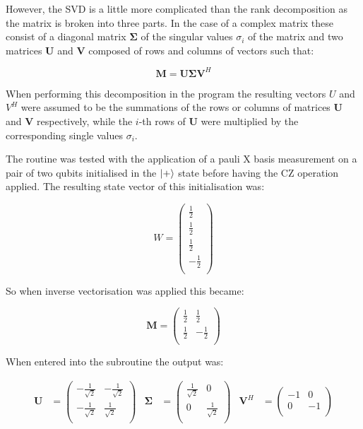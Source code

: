 However, the SVD is a little more complicated than the rank decomposition as the matrix is broken into three parts. In the case of a complex matrix these consist of a diagonal matrix $\boldsymbol{\Sigma}$ of the singular values $\sigma_{i}$ of the matrix and two matrices $\mathbf{U}$ and $\mathbf{V}$ composed of rows and columns of vectors such that:

\begin{equation}
\mathbf{M} = \mathbf{U} \boldsymbol{\Sigma} \mathbf{V}^{H}
\end{equation}

When performing this decomposition in the program the resulting vectors $U$ and $V^{H}$ were assumed to be the summations of the rows or columns of matrices $\mathbf{U}$ and $\mathbf{V}$ respectively, while the $i$-th rows of $\mathbf{U}$ were multiplied by the corresponding single values $\sigma_{i}$.

The routine was tested with the application of a pauli X basis measurement on a pair of two qubits initialised in the $\ket{+}$ state before having the CZ operation applied. The resulting state vector of this initialisation was:

\begin{equation}
W =
\begin{pmatrix}
\frac{1}{2} \\
\frac{1}{2} \\
\frac{1}{2} \\
- \frac{1}{2} \\
\end{pmatrix}
\end{equation}

So when inverse vectorisation was applied this became:

\begin{equation}
\mathbf{M} =
\begin{pmatrix}
\frac{1}{2} &
\frac{1}{2} \\
\frac{1}{2} &
- \frac{1}{2} \\
\end{pmatrix}
\end{equation}

When entered into the subroutine the output was:

\begin{align}
\mathbf{U} &=
\begin{pmatrix}
-\frac{1}{\sqrt{2}} &
-\frac{1}{\sqrt{2}} \\
-\frac{1}{\sqrt{2}} &
\frac{1}{\sqrt{2}} \\
\end{pmatrix}
&
\boldsymbol{\Sigma} &=
\begin{pmatrix}
\frac{1}{\sqrt{2}} &
0 \\
0 &
\frac{1}{\sqrt{2}} \\
\end{pmatrix}
&
\mathbf{V}^{H} &=
\begin{pmatrix}
-1 &
0 \\
0 &
-1 \\
\end{pmatrix}
\end{align}

